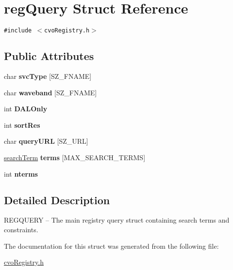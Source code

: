 \hypertarget{structregQuery}{
\section{regQuery Struct Reference}
\label{structregQuery}
}
{\tt \#include $<$cvoRegistry.h$>$}

\subsection*{Public Attributes}
\begin{CompactItemize}
\item 
\hypertarget{structregQuery_c63bcc7845820335792784e0ec3a3e17}{
char \textbf{svcType} \mbox{[}SZ\_\-FNAME\mbox{]}}
\label{structregQuery_c63bcc7845820335792784e0ec3a3e17}

\item 
\hypertarget{structregQuery_678a50d9e5f0760242ab2c0fda20dfb5}{
char \textbf{waveband} \mbox{[}SZ\_\-FNAME\mbox{]}}
\label{structregQuery_678a50d9e5f0760242ab2c0fda20dfb5}

\item 
\hypertarget{structregQuery_125c1c5a9988ad7d3aa57947e8ac14cb}{
int \textbf{DALOnly}}
\label{structregQuery_125c1c5a9988ad7d3aa57947e8ac14cb}

\item 
\hypertarget{structregQuery_c449b94b52c3a032ac964776f04a8536}{
int \textbf{sortRes}}
\label{structregQuery_c449b94b52c3a032ac964776f04a8536}

\item 
\hypertarget{structregQuery_d4c6d6490d6dc08ecfa5252899f32a29}{
char \textbf{queryURL} \mbox{[}SZ\_\-URL\mbox{]}}
\label{structregQuery_d4c6d6490d6dc08ecfa5252899f32a29}

\item 
\hypertarget{structregQuery_64cc59cf5372f043fa6d66fac29912f3}{
\hyperlink{structsearchTerm}{searchTerm} \textbf{terms} \mbox{[}MAX\_\-SEARCH\_\-TERMS\mbox{]}}
\label{structregQuery_64cc59cf5372f043fa6d66fac29912f3}

\item 
\hypertarget{structregQuery_a4b0ca5e344acad33ef971ca0667f38f}{
int \textbf{nterms}}
\label{structregQuery_a4b0ca5e344acad33ef971ca0667f38f}

\end{CompactItemize}


\subsection{Detailed Description}
REGQUERY -- The main registry query struct containing search terms and constraints. 

The documentation for this struct was generated from the following file:\begin{CompactItemize}
\item 
\hyperlink{cvoRegistry_8h}{cvoRegistry.h}\end{CompactItemize}
